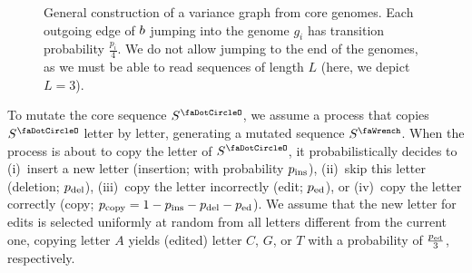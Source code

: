 \begin{figure}
	\caption{General construction of a variance graph from core genomes. Each outgoing edge of $b$ jumping into the  genome $g_i$ has transition probability $\frac{p_i}{4}$. We do not allow jumping to the end of the genomes, as we must be able to read sequences of length $L$ (here, we depict $L=3$).}
	\label{fig:construct-variance-graph}
\end{figure}


To mutate the core sequence $\seq^\gcore$, we assume a process that copies $\seq^\gcore$ letter by letter, generating a mutated sequence $\seq^\gmut$.
When the process is about to copy the  letter of $\seq^\gcore$, it probabilistically decides to (i)~insert a new letter (insertion; with probability $p_\text{ins}$), (ii)~skip this letter (deletion; $p_\text{del}$), (iii)~copy the letter incorrectly (edit; $p_\text{ed}$), or (iv)~copy the letter correctly (copy; $p_\text{copy}=1-p_\text{ins}-p_\text{del}-p_\text{ed}$).
We assume that the new letter for edits is selected uniformly at random from all letters different from the current one, \eg copying letter $A$ yields (edited) letter $C$, $G$, or $T$ with a probability of $\frac{p_\text{ed}}{3}$, respectively.

